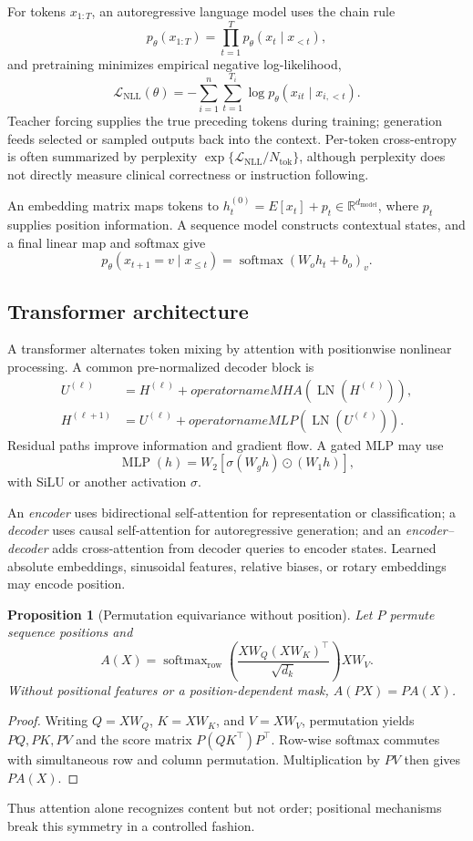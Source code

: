 \documentclass[12pt,oneside]{book}
\numberwithin{equation}{section}
\theoremstyle{definition}
\theoremstyle{plain}
\newtheorem{proposition}{Proposition}[section]
\theoremstyle{remark}
\newcommand{\R}{\mathbb{R}}
\begin{document}
For tokens $x_{1:T}$, an autoregressive language model uses the chain rule
\begin{equation}
 p_\theta(x_{1:T})=\prod_{t=1}^T p_\theta(x_t\mid x_{<t}),
 \label{eq:autoregressive-factorization}
\end{equation}
and pretraining minimizes empirical negative log-likelihood,
\[
 \mathcal L_{\mathrm{NLL}}(\theta)
 =-\sum_{i=1}^n\sum_{t=1}^{T_i}
   \log p_\theta(x_{it}\mid x_{i,<t}).
\]
Teacher forcing supplies the true preceding tokens during training; generation
feeds selected or sampled outputs back into the context.  Per-token
cross-entropy is often summarized by perplexity
$\exp\{\mathcal L_{\mathrm{NLL}}/N_{\mathrm{tok}}\}$, although perplexity does
not directly measure clinical correctness or instruction following.

An embedding matrix maps tokens to
$h_t^{(0)}=E[x_t]+p_t\in\R^{d_{\mathrm{model}}}$, where $p_t$ supplies position
information.  A sequence model constructs contextual states, and a final
linear map and softmax give
\[
 p_\theta(x_{t+1}=v\mid x_{\le t})
 =\operatorname{softmax}(W_oh_t+b_o)_v.
\]

\subsection{Transformer architecture}

A transformer alternates token mixing by attention with positionwise nonlinear
processing.  A common pre-normalized decoder block is
\begin{align*}
 U^{(\ell)}&=H^{(\ell)}+operatorname{MHA}
       \!\left(\operatorname{LN}(H^{(\ell)})\right),\\
 H^{(\ell+1)}&=U^{(\ell)}+operatorname{MLP}
       \!\left(\operatorname{LN}(U^{(\ell)})\right).
\end{align*}
Residual paths improve information and gradient flow.  A gated MLP may use
\[
 \operatorname{MLP}(h)=W_2[\sigma(W_gh)\odot(W_1h)],
\]
with SiLU or another activation $\sigma$.

An \emph{encoder} uses bidirectional self-attention for representation or
classification; a \emph{decoder} uses causal self-attention for autoregressive
generation; and an \emph{encoder--decoder} adds cross-attention from decoder
queries to encoder states.  Learned absolute embeddings, sinusoidal features,
relative biases, or rotary embeddings may encode position.

\begin{proposition}[Permutation equivariance without position]
Let $P$ permute sequence positions and
\[
 A(X)=\operatorname{softmax}_{\mathrm{row}}
 \!\left(\frac{XW_Q(XW_K)^\top}{\sqrt{d_k}}\right)XW_V.
\]
Without positional features or a position-dependent mask, $A(PX)=PA(X)$.
\end{proposition}
\begin{proof}
Writing $Q=XW_Q$, $K=XW_K$, and $V=XW_V$, permutation yields $PQ,PK,PV$ and
the score matrix $P(QK^\top)P^\top$.  Row-wise softmax commutes with simultaneous
row and column permutation.  Multiplication by $PV$ then gives $PA(X)$.
\end{proof}
Thus attention alone recognizes content but not order; positional mechanisms
break this symmetry in a controlled fashion.
\end{document}

